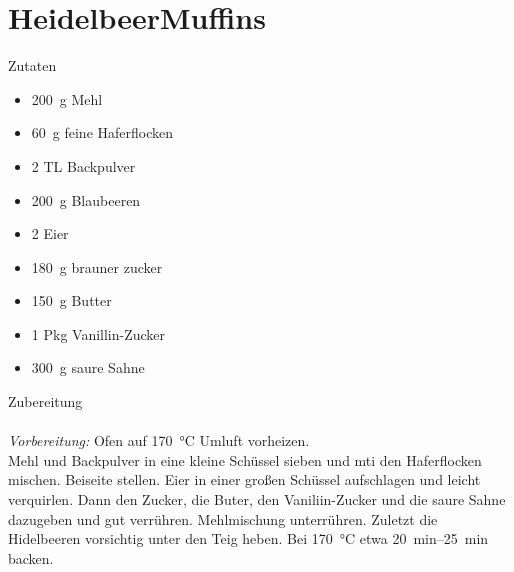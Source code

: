 \section*{HeidelbeerMuffins}
\ihead{}\ohead{}
\cfoot{}
{\Large Zutaten}
\begin{multicols}{2}
\begin{itemize}
    \item \SI{200}{g} Mehl
    \item \SI{60}{g} feine Haferflocken
    \item \num{2} TL Backpulver
    \item \SI{200}{g} Blaubeeren
    \item \num{2} Eier
    \item \SI{180}{g} brauner zucker
    \item \SI{150}{g} Butter
    \item \num{1} Pkg Vanillin-Zucker
    \item \SI{300}{g} saure Sahne
\end{itemize}
\end{multicols}
\noindent
{\Large Zubereitung}\\
\\
\textit{Vorbereitung:} Ofen auf \SI{170}{\celsius} Umluft vorheizen.\\
Mehl und Backpulver in eine kleine Schüssel sieben und mti den Haferflocken mischen. 
Beiseite stellen.
Eier in einer großen Schüssel aufschlagen und leicht verquirlen.
Dann den Zucker, die Buter, den Vaniliin-Zucker und die saure Sahne dazugeben und gut verrühren. 
Mehlmischung unterrühren.
Zuletzt die Hidelbeeren vorsichtig unter den Teig heben.
Bei \SI{170}{\celsius} etwa \SIrange{20}{25}{min} backen.
